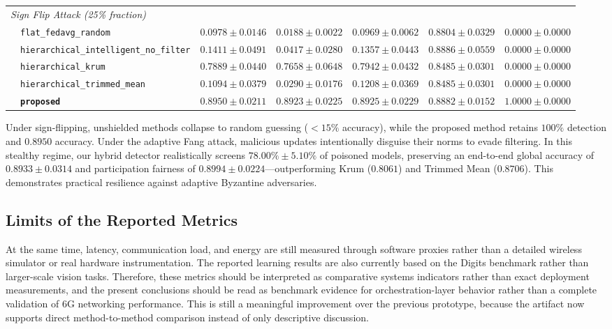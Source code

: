 \documentclass[conference]{IEEEtran}
\begin{document}
\begin{table}[t]
{\begin{tabular}{llccccc}
\midrule
\multicolumn{7}{l}{\textit{Sign Flip Attack (25\% fraction)}} \\
 & \texttt{flat\_fedavg\_random} & $0.0978 \pm 0.0146$ & $0.0188 \pm 0.0022$ & $0.0969 \pm 0.0062$ & $0.8804 \pm 0.0329$ & $0.0000 \pm 0.0000$ \\
 & \texttt{hierarchical\_intelligent\_no\_filter} & $0.1411 \pm 0.0491$ & $0.0417 \pm 0.0280$ & $0.1357 \pm 0.0443$ & $0.8886 \pm 0.0559$ & $0.0000 \pm 0.0000$ \\
 & \texttt{hierarchical\_krum} & $0.7889 \pm 0.0440$ & $0.7658 \pm 0.0648$ & $0.7942 \pm 0.0432$ & $0.8485 \pm 0.0301$ & $0.0000 \pm 0.0000$ \\
 & \texttt{hierarchical\_trimmed\_mean} & $0.1094 \pm 0.0379$ & $0.0290 \pm 0.0176$ & $0.1208 \pm 0.0369$ & $0.8485 \pm 0.0301$ & $0.0000 \pm 0.0000$ \\
 & \textbf{\texttt{proposed}} & $\mathbf{0.8950 \pm 0.0211}$ & $\mathbf{0.8923 \pm 0.0225}$ & $\mathbf{0.8925 \pm 0.0229}$ & $\mathbf{0.8882 \pm 0.0152}$ & $\mathbf{1.0000 \pm 0.0000}$ \\
\bottomrule
\end{tabular}
}
\end{table}

Under sign-flipping, unshielded methods collapse to random guessing ($<15\%$ accuracy), while the proposed method retains $100\%$ detection and $0.8950$ accuracy. Under the adaptive Fang attack, malicious updates intentionally disguise their norms to evade filtering. In this stealthy regime, our hybrid detector realistically screens $78.00\% \pm 5.10\%$ of poisoned models, preserving an end-to-end global accuracy of $0.8933 \pm 0.0314$ and participation fairness of $0.8994 \pm 0.0224$—outperforming Krum ($0.8061$) and Trimmed Mean ($0.8706$). This demonstrates practical resilience against adaptive Byzantine adversaries.

\subsection{Limits of the Reported Metrics}
At the same time, latency, communication load, and energy are still measured through software proxies rather than a detailed wireless simulator or real hardware instrumentation. The reported learning results are also currently based on the Digits benchmark rather than larger-scale vision tasks. Therefore, these metrics should be interpreted as comparative systems indicators rather than exact deployment measurements, and the present conclusions should be read as benchmark evidence for orchestration-layer behavior rather than a complete validation of 6G networking performance. This is still a meaningful improvement over the previous prototype, because the artifact now supports direct method-to-method comparison instead of only descriptive discussion.
\end{document}

